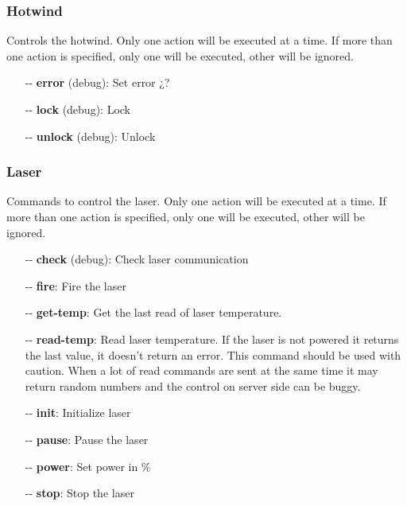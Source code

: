 \documentclass[letterpaper, 10 pt]{article}
\begin{document}
\subsubsection{Hotwind}
Controls the hotwind. Only one action will be executed at a time. If more than one action is specified, only one will be executed, other will be ignored.
\begin{itemize}
	\item[-{}-] \textbf{error} (debug): Set error ¿?
	\item[-{}-] \textbf{lock} (debug): Lock
	\item[-{}-] \textbf{unlock} (debug): Unlock
\end{itemize}

\subsubsection{Laser}
Commands to control the laser. Only one action will be executed at a time. If more than one action is specified, only one will be executed, other will be ignored.
\begin{itemize}
	\item[-{}-] \textbf{check } (debug): Check laser communication
	\item[-{}-] \textbf{fire}: Fire the laser
	\item[-{}-] \textbf{get-temp}: Get the last read of laser temperature.
	\item[-{}-] \textbf{read-temp}: Read laser temperature. If the laser is not powered it returns the last value, it doesn't return an error. This command should be used with caution. When a lot of read commands are sent at the same time it may return random numbers and the control on server side can be buggy.
	\item[-{}-] \textbf{init}: Initialize laser
	\item[-{}-] \textbf{pause}: Pause the laser
	\item[-{}-] \textbf{power}: Set power in \%
	\item[-{}-] \textbf{stop}: Stop the laser
\end{itemize}
\end{document}
